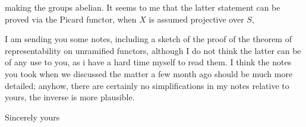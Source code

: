 making the groups abelian. It seems to me that the latter statement can be proved via the Picard functor, when $X$ is assumed projective over $S$,

I am sending you some notes, including a sketch of the proof of the theorem of representability on unramified functors, although I do not think the latter can be of any use to you, as i have a hard time myself to read them. I think the notes you took when we discussed the matter a few month ago should be much more detailed; anyhow, there are certainly no simplifications in my notes relative to yours, the inverse is more plausible.

Sincerely yours\\
